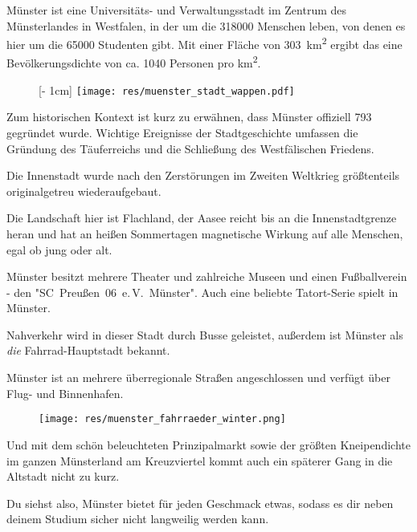 \begin{multicols}{2}
Münster ist eine Universitäts- und Verwaltungsstadt im Zentrum des Münsterlandes in Westfalen, in der um die \num{318000} Menschen leben, von denen es hier um die \num{65000} Studenten gibt.
Mit einer Fläche von \SI{303}{\km\squared} ergibt das eine Bevölkerungsdichte von ca. \num{1040} Personen pro \si{\km\squared}.

\setlength{\intextsep}{0cm}
{%
\setlength{\columnsep}{2mm}
\begin{wrapfigure}[6]{r}[2mm]{0cm}
	\raisebox{0pt}[\dimexpr\height - 1cm\relax]{%
		\texttt{[image: res/muenster\_stadt\_wappen.pdf]}%
	}
\end{wrapfigure}
Zum historischen Kontext ist kurz zu erwähnen, dass Münster offiziell 793 gegründet wurde.
Wichtige Ereignisse der Stadtgeschichte umfassen die Gründung des Täuferreichs und die Schließung des Westfälischen Friedens.\par}

Die Innenstadt wurde nach den Zerstörungen im Zweiten Weltkrieg größtenteils originalgetreu wiederaufgebaut.

Die Landschaft hier ist Flachland, der Aasee reicht bis an die Innenstadtgrenze heran und hat an heißen Sommertagen magnetische Wirkung auf alle Menschen, egal ob jung oder alt.

Münster besitzt mehrere Theater und zahlreiche Museen und einen Fußballverein - den "SC~Preußen~06~e.\,V.~Münster".
Auch eine beliebte Tatort-Serie spielt in Münster.

Nahverkehr wird in dieser Stadt durch Busse geleistet, außerdem ist Münster als \textit{die} Fahrrad-Hauptstadt bekannt. 

Münster ist an mehrere überregionale Straßen angeschlossen und verfügt über Flug- und Binnenhafen.

\setlength{\columnsep}{2mm}
\begin{wrapfigure}[8]{l}[1mm]{0cm}
	\texttt{[image: res/muenster\_fahrraeder\_winter.png]}
\end{wrapfigure}
Und mit dem schön beleuchteten Prinzipalmarkt sowie der größten Kneipendichte im ganzen Münsterland am Kreuzviertel kommt auch ein späterer Gang in die Altstadt nicht zu kurz.

Du siehst also, Münster bietet für jeden Geschmack etwas, sodass es dir neben deinem Studium sicher nicht langweilig werden kann.

\begin{center}
	\large{}
\end{center}

\end{multicols}
